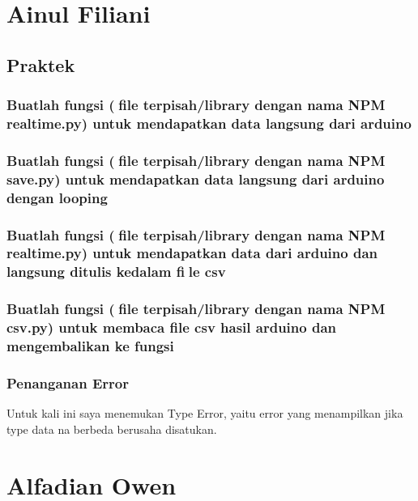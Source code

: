\section{Ainul Filiani}
\subsection{Praktek}
\subsubsection{Buatlah fungsi (file terpisah/library dengan nama NPM realtime.py) untuk mendapatkan data langsung dari arduino}


\subsubsection{Buatlah fungsi (file terpisah/library dengan nama NPM save.py) untuk mendapatkan data langsung dari arduino dengan looping}


\subsubsection{Buatlah fungsi (file terpisah/library dengan nama NPM realtime.py) untuk mendapatkan data dari arduino dan langsung ditulis kedalam file csv}


\subsubsection{Buatlah fungsi (file terpisah/library dengan nama NPM csv.py) untuk membaca file csv hasil arduino dan mengembalikan ke fungsi}


\subsubsection{Penanganan Error}
Untuk kali ini saya menemukan Type Error, yaitu error yang menampilkan jika type data na berbeda berusaha disatukan.


\section{Alfadian Owen}
